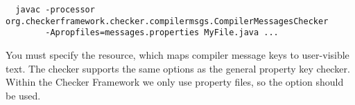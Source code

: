 \begin{Verbatim}
  javac -processor org.checkerframework.checker.compilermsgs.CompilerMessagesChecker
        -Apropfiles=messages.properties MyFile.java ...
\end{Verbatim}

You must specify the resource, which maps compiler message keys to user-visible
text.  The checker supports the same options as the general property key checker.
Within the Checker Framework we only use property files,
so the  option should be used.


